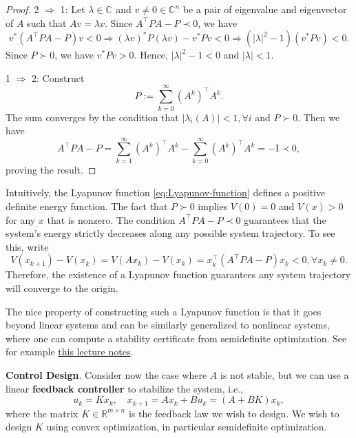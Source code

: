 \documentclass[
]{book}
\theoremstyle{definition}
\theoremstyle{definition}
\theoremstyle{definition}
\theoremstyle{definition}
\theoremstyle{remark}
\begin{document}
\begin{proof}
2 \(\Rightarrow\) 1: Let \(\lambda \in \mathbb{C}^{}\) and \(v  \neq 0 \in \mathbb{C}^{n}\) be a pair of eigenvalue and eigenvector of \(A\) such that \(A v = \lambda v\). Since \(A^\top P A - P \prec 0\), we have
\[
v^* (A^\top P A - P) v < 0 \Rightarrow (\lambda v)^* P (\lambda v) - v^* P v < 0 \Rightarrow (|\lambda|^2 - 1) (v^* P v) < 0.
\]
Since \(P \succ 0\), we have \(v^* P v > 0\). Hence, \(|\lambda|^2 - 1 < 0\) and \(|\lambda| < 1\).

1 \(\Rightarrow\) 2: Construct
\[
P := \sum_{k=0}^{\infty} (A^k)^\top A^k.
\]
The sum converges by the condition that \(|\lambda_i(A)| < 1,\forall i\) and \(P \succ 0\). Then we have
\[
A^\top P A - P = \sum_{k=1}^{\infty} (A^k)^\top A^k - \sum_{k=0}^{\infty} (A^k)^\top A^k = - \mathrm{I}\prec 0,
\]
proving the result.
\end{proof}

Intuitively, the Lyapunov function \eqref{eq:Lyapunov-function} defines a positive definite energy function. The fact that \(P \succ 0\) implies \(V(0) = 0\) and \(V(x) > 0\) for any \(x\) that is nonzero. The condition \(A^\top P A - P \prec 0\) guarantees that the system's energy strictly decreases along any possible system trajectory. To see this, write
\[
V(x_{k+1}) - V(x_k) = V(Ax_k) - V(x_k) = x_k^\top(A^\top P A - P) x_k < 0, \forall x_k \neq 0.
\]
Therefore, the existence of a Lyapunov function guarantees any system trajectory will converge to the origin.

The nice property of constructing such a Lyapunov function is that it goes beyond linear systems and can be similarly generalized to nonlinear systems, where one can compute a stability certificate from semidefinite optimization. See for example \href{https://hankyang.seas.harvard.edu/OptimalControlEstimation/stability.html\#lyapunov-analysis}{this lecture notes}.

\textbf{Control Design}. Consider now the case where \(A\) is not stable, but we can use a linear \textbf{feedback controller} to stabilize the system, i.e.,
\[
u_k = K x_k, \quad x_{k+1} = A x_k + B u_k = (A+ BK) x_k,
\]
where the matrix \(K \in \mathbb{R}^{m \times n}\) is the feedback law we wish to design. We wish to design \(K\) using convex optimization, in particular semidefinite optimization.
\end{document}
